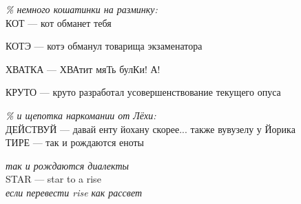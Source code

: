 \emph{\% немного кошатинки на разминку:}\\
КОТ --- кот обманет тебя


КОТЭ --- котэ обманул товарища экзаменатора


ХВАТКА --- ХВАтит мяТь булКи! А!


КРУТО --- круто разработал усовершенствование текущего опуса


\emph{\% и щепотка наркомании от Лёхи:}\\
ДЕЙСТВУЙ --- давай енту йохану скорее... также вувузелу у Йорика\\
ТИРЕ --- так и рождаются еноты


\emph{так и рождаются диалекты}\\
STAR --- star to a rise\\
\emph{если перевести rise как рассвет}
